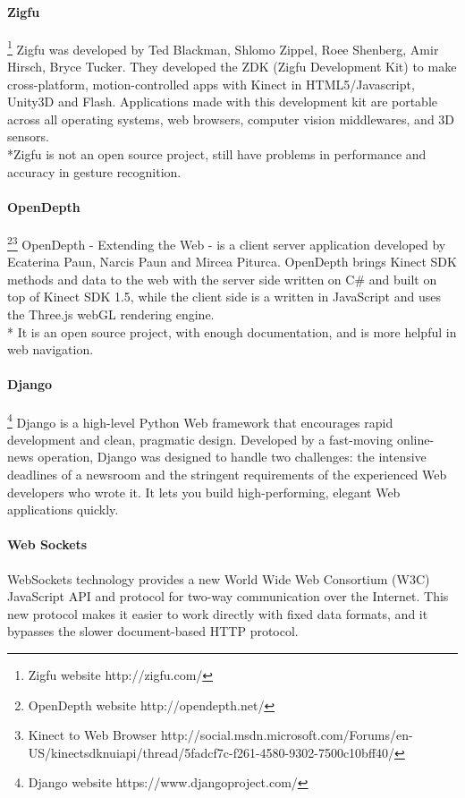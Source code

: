 \paragraph{Zigfu}\footnote{Zigfu website http://zigfu.com/}
Zigfu was developed by Ted Blackman, Shlomo Zippel, Roee Shenberg, Amir Hirsch, Bryce Tucker. They developed the ZDK (Zigfu Development Kit) to make cross-platform, motion-controlled apps with Kinect in HTML5/Javascript, Unity3D and Flash. Applications made with this development kit are portable across all operating systems, web browsers, computer vision middlewares, and 3D sensors. 
\\*Zigfu is not an open source project, still have problems in performance and accuracy in gesture recognition.

\paragraph{OpenDepth}\footnote{OpenDepth website http://opendepth.net/}\footnote{Kinect to Web Browser http://social.msdn.microsoft.com/Forums/en-US/kinectsdknuiapi/thread/5fadcf7c-f261-4580-9302-7500c10bff40/}
OpenDepth - Extending the Web - is a client server application developed by Ecaterina Paun, Narcis Paun and Mircea Piturca. OpenDepth brings Kinect SDK methods and data to the web with the server side written on C\# and built on top of Kinect SDK 1.5, while the client side is a written in JavaScript and uses the Three.js webGL rendering engine.
\\* It is an open source project, with enough documentation, and is more helpful in web navigation.

\paragraph{Django}\footnote{Django website https://www.djangoproject.com/}
Django is a high-level Python Web framework that encourages rapid development and clean, pragmatic design. Developed by a fast-moving online-news operation, Django was designed to handle two challenges: the intensive deadlines of a newsroom and the stringent requirements of the experienced Web developers who wrote it. It lets you build high-performing, elegant Web applications quickly.

\paragraph{Web Sockets}
WebSockets technology provides a new World Wide Web Consortium (W3C) JavaScript API and protocol for two-way communication over the Internet. This new protocol makes it easier to work directly with fixed data formats, and it bypasses the slower document-based HTTP protocol.

